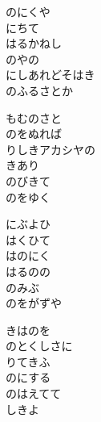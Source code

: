 \documentclass[10pt,b5j]{tarticle} %
\begin{document}
\vspace{1.5em} %
\newcommand{\linespace}{0.5em} %
\newcommand{\blocksize}{0.5\hsize} %
\begin{enumerate} %
    \begin{minipage}[c]{\blocksize}
    
        \vspace{\linespace}
        \item
        のにくや\\
        にちて\\
        はるかねし\\
        のやの\\
        にしあれどそはき\\
        のふるさとか
        
        \vspace{\linespace}
        \item
        もむのさと\\
        のをぬれば\\
        りしきアカシヤの\\
        きあり\\
        のびきて\\
        のをゆく
        
        \vspace{\linespace}
        \item
        にぶよひ\\
        はくひて\\
        はのにく\\
        はるのの\\
        のみぶ\\
        のをがずや
        
        \vspace{\linespace}
        \item
        きはのを\\
        のとくしさに\\
        りてきふ\\
        のにする\\
        のはえてて\\
        しきよ
        

\end{minipage}
\end{enumerate}
\end{document}
